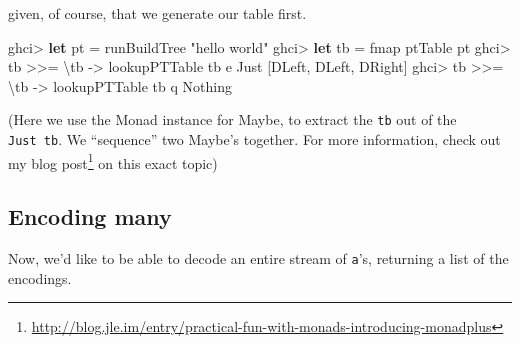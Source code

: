 \documentclass[]{article}
\newenvironment{Shaded}{}{}
\newcommand{\CharTok}[1]{\textcolor[rgb]{0.25,0.44,0.63}{#1}}
\newcommand{\CommentTok}[1]{\textcolor[rgb]{0.38,0.63,0.69}{\textit{#1}}}
\newcommand{\DataTypeTok}[1]{\textcolor[rgb]{0.56,0.13,0.00}{#1}}
\newcommand{\FunctionTok}[1]{\textcolor[rgb]{0.02,0.16,0.49}{#1}}
\newcommand{\KeywordTok}[1]{\textcolor[rgb]{0.00,0.44,0.13}{\textbf{#1}}}
\newcommand{\NormalTok}[1]{#1}
\newcommand{\OperatorTok}[1]{\textcolor[rgb]{0.40,0.40,0.40}{#1}}
\newcommand{\OtherTok}[1]{\textcolor[rgb]{0.00,0.44,0.13}{#1}}
\newcommand{\StringTok}[1]{\textcolor[rgb]{0.25,0.44,0.63}{#1}}
\renewcommand{\href}[2]{#2\footnote{\url{#1}}}
\begin{document}
given, of course, that we generate our table first.

\begin{Shaded}
\begin{Highlighting}[]
\NormalTok{ghci}\OperatorTok{\textgreater{}} \KeywordTok{let}\NormalTok{ pt }\OtherTok{=}\NormalTok{ runBuildTree }\StringTok{"hello world"}
\NormalTok{ghci}\OperatorTok{\textgreater{}} \KeywordTok{let}\NormalTok{ tb }\OtherTok{=} \FunctionTok{fmap}\NormalTok{ ptTable pt}
\NormalTok{ghci}\OperatorTok{\textgreater{}}\NormalTok{ tb }\OperatorTok{\textgreater{}\textgreater{}=}\NormalTok{ \textbackslash{}tb\textquotesingle{} }\OtherTok{{-}\textgreater{}}\NormalTok{ lookupPTTable tb\textquotesingle{} }\CharTok{\textquotesingle{}e\textquotesingle{}}
\DataTypeTok{Just}\NormalTok{ [}\DataTypeTok{DLeft}\NormalTok{, }\DataTypeTok{DLeft}\NormalTok{, }\DataTypeTok{DRight}\NormalTok{]}
\NormalTok{ghci}\OperatorTok{\textgreater{}}\NormalTok{ tb }\OperatorTok{\textgreater{}\textgreater{}=}\NormalTok{ \textbackslash{}tb\textquotesingle{} }\OtherTok{{-}\textgreater{}}\NormalTok{ lookupPTTable tb\textquotesingle{} }\CharTok{\textquotesingle{}q\textquotesingle{}}
\DataTypeTok{Nothing}
\end{Highlighting}
\end{Shaded}

(Here we use the Monad instance for Maybe, to extract the
\texttt{tb\textquotesingle{}} out of the \texttt{Just\ tb}. We ``sequence'' two
Maybe's together. For more information, check out my
\href{http://blog.jle.im/entry/practical-fun-with-monads-introducing-monadplus}{blog
post} on this exact topic)

\subsection{Encoding many}\label{encoding-many}

Now, we'd like to be able to decode an entire stream of \texttt{a}'s, returning
a list of the encodings.

\begin{Shaded}
\end{Shaded}
\end{document}
